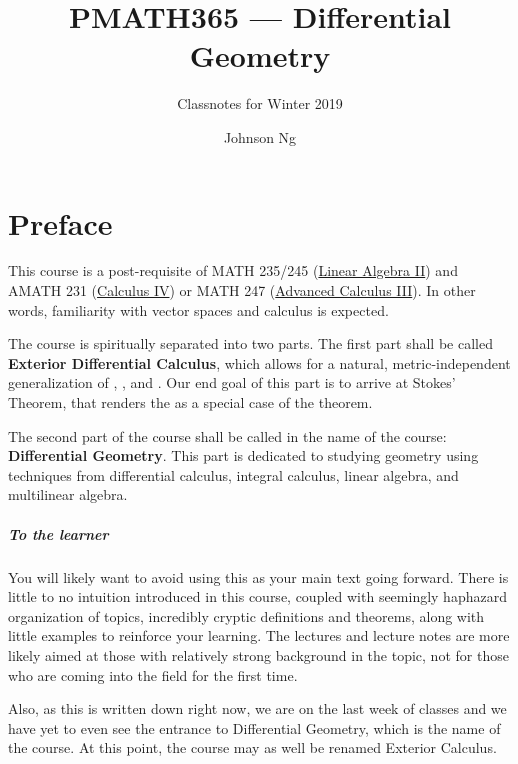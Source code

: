 \documentclass[notoc,notitlepage]{tufte-book}
\title{PMATH365 --- Differential Geometry}
\author{Johnson Ng}
\subtitle{Classnotes for Winter 2019}
\begin{document}


\chapter*{Preface}%
\label{chp:preface}

\nocite{karigiannis2019}

This course is a post-requisite of MATH 235/245 
(\href{http://www.ucalendar.uwaterloo.ca/1819/COURSE/course-MATH.html\#MATH235}{Linear Algebra II})
and AMATH 231 
(\href{http://www.ucalendar.uwaterloo.ca/1819/COURSE/course-AMATH.html#AMATH231}{Calculus IV})
or MATH 247 
(\href{http://www.ucalendar.uwaterloo.ca/1819/COURSE/course-MATH.html#MATH247}{Advanced Calculus III}).
In other words, familiarity with vector spaces and calculus is expected.

The course is spiritually separated into two parts. The first part shall be called 
\textbf{Exterior Differential Calculus}, which allows for a natural, metric-independent
generalization of , , and 
. Our end goal of this part is to arrive at Stokes' Theorem,
that renders the  as a special case of the theorem.

The second part of the course shall be called in the name of the course: 
\textbf{Differential Geometry}. This part is dedicated to studying geometry using techniques from
differential calculus, integral calculus, linear algebra, and multilinear algebra.

\paragraph{To the learner} You will likely want to avoid using this as your main
text going forward. There is little to no intuition introduced in this course,
coupled with seemingly haphazard organization of topics, incredibly cryptic
definitions and theorems, along with little examples to reinforce your learning.
The lectures and lecture notes are more likely aimed at those with relatively
strong background in the topic, not for those who are coming into the field for
the first time.

Also, as this is written down right now, we are on the last week of classes and
we have yet to even see the entrance to Differential Geometry, which is the name
of the course. At this point, the course may as well be renamed Exterior Calculus.
\end{document}
